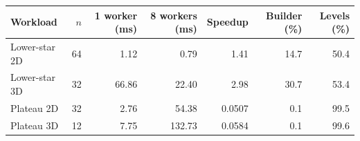 \begin{tabular}{lrrrrrr}
\hline
Workload & $n$ & 1 worker (ms) & 8 workers (ms) & Speedup & Builder (\%) & Levels (\%) \\
\hline
Lower-star 2D & 64 & 1.12 & 0.79 & 1.41 & 14.7 & 50.4 \\
Lower-star 3D & 32 & 66.86 & 22.40 & 2.98 & 30.7 & 53.4 \\
Plateau 2D & 32 & 2.76 & 54.38 & 0.0507 & 0.1 & 99.5 \\
Plateau 3D & 12 & 7.75 & 132.73 & 0.0584 & 0.1 & 99.6 \\
\hline
\end{tabular}
